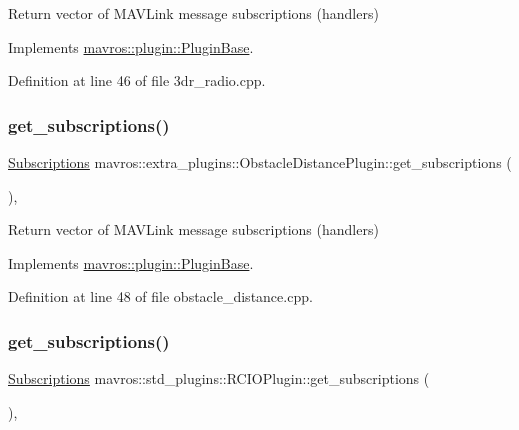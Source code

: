 Return vector of M\+A\+V\+Link message subscriptions (handlers) 



Implements \mbox{\hyperlink{group__plugin_gaf4e23fec6d7436a62cbf0942a2e5791c}{mavros\+::plugin\+::\+Plugin\+Base}}.



Definition at line 46 of file 3dr\+\_\+radio.\+cpp.

\mbox{\label{group__plugin_ga03eef1ca035e4ab4ca9eb0841b6d9eef}} 
\subsubsection{\texorpdfstring{get\_subscriptions()}{get\_subscriptions()}\hspace{0.1cm}{\footnotesize\ttfamily [13/41]}}
{\footnotesize\ttfamily \mbox{\hyperlink{group__plugin_ga8967d61fc77040e0c3ea5a4585d62a09}{Subscriptions}} mavros\+::extra\+\_\+plugins\+::\+Obstacle\+Distance\+Plugin\+::get\+\_\+subscriptions (\begin{DoxyParamCaption}{ }\end{DoxyParamCaption})\hspace{0.3cm}{\ttfamily [inline]}, {\ttfamily [virtual]}}



Return vector of M\+A\+V\+Link message subscriptions (handlers) 



Implements \mbox{\hyperlink{group__plugin_gaf4e23fec6d7436a62cbf0942a2e5791c}{mavros\+::plugin\+::\+Plugin\+Base}}.



Definition at line 48 of file obstacle\+\_\+distance.\+cpp.

\mbox{\label{group__plugin_gafd86a5abaa163c230462ad68151abdff}} 
\subsubsection{\texorpdfstring{get\_subscriptions()}{get\_subscriptions()}\hspace{0.1cm}{\footnotesize\ttfamily [14/41]}}
{\footnotesize\ttfamily \mbox{\hyperlink{group__plugin_ga8967d61fc77040e0c3ea5a4585d62a09}{Subscriptions}} mavros\+::std\+\_\+plugins\+::\+R\+C\+I\+O\+Plugin\+::get\+\_\+subscriptions (\begin{DoxyParamCaption}{ }\end{DoxyParamCaption})\hspace{0.3cm}{\ttfamily [inline]}, {\ttfamily [virtual]}}



